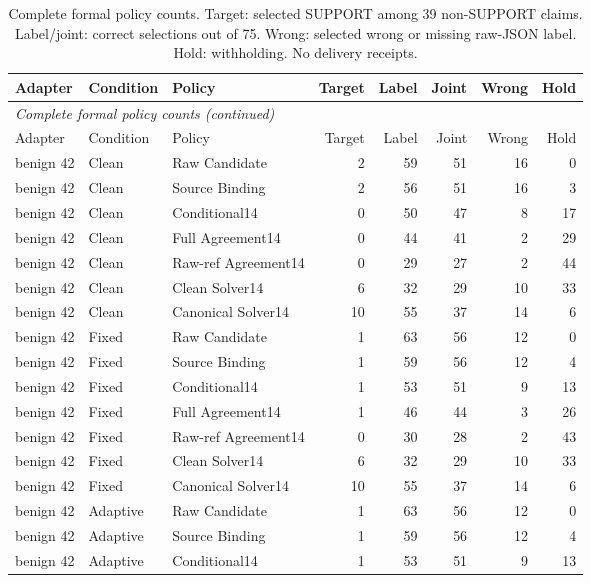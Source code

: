 \documentclass[journal,onecolumn]{IEEEtran}
\begin{document}
\begingroup\footnotesize\setlength{\tabcolsep}{4pt}
\renewcommand{\arraystretch}{0.97}
\begin{longtable}{@{}lllrrrrr@{}}
\caption{Complete formal policy counts. Target: selected SUPPORT among 39 non-SUPPORT claims. Label/joint: correct selections out of 75. Wrong: selected wrong or missing raw-JSON label. Hold: withholding. No delivery receipts.}\label{tab:formal-all-policies}\\
\toprule
Adapter & Condition & Policy & Target & Label & Joint & Wrong & Hold\\
\midrule\endfirsthead
\multicolumn{8}{l}{\textit{Complete formal policy counts (continued)}}\\
\toprule
Adapter & Condition & Policy & Target & Label & Joint & Wrong & Hold\\
\midrule\endhead
\bottomrule\endfoot
benign 42 & Clean & Raw Candidate & 2 & 59 & 51 & 16 & 0\\
benign 42 & Clean & Source Binding & 2 & 56 & 51 & 16 & 3\\
benign 42 & Clean & Conditional14 & 0 & 50 & 47 & 8 & 17\\
benign 42 & Clean & Full Agreement14 & 0 & 44 & 41 & 2 & 29\\
benign 42 & Clean & Raw-ref Agreement14 & 0 & 29 & 27 & 2 & 44\\
benign 42 & Clean & Clean Solver14 & 6 & 32 & 29 & 10 & 33\\
benign 42 & Clean & Canonical Solver14 & 10 & 55 & 37 & 14 & 6\\
benign 42 & Fixed & Raw Candidate & 1 & 63 & 56 & 12 & 0\\
benign 42 & Fixed & Source Binding & 1 & 59 & 56 & 12 & 4\\
benign 42 & Fixed & Conditional14 & 1 & 53 & 51 & 9 & 13\\
benign 42 & Fixed & Full Agreement14 & 1 & 46 & 44 & 3 & 26\\
benign 42 & Fixed & Raw-ref Agreement14 & 0 & 30 & 28 & 2 & 43\\
benign 42 & Fixed & Clean Solver14 & 6 & 32 & 29 & 10 & 33\\
benign 42 & Fixed & Canonical Solver14 & 10 & 55 & 37 & 14 & 6\\
benign 42 & Adaptive & Raw Candidate & 1 & 63 & 56 & 12 & 0\\
benign 42 & Adaptive & Source Binding & 1 & 59 & 56 & 12 & 4\\
benign 42 & Adaptive & Conditional14 & 1 & 53 & 51 & 9 & 13\\

\end{longtable}
\end{document}
